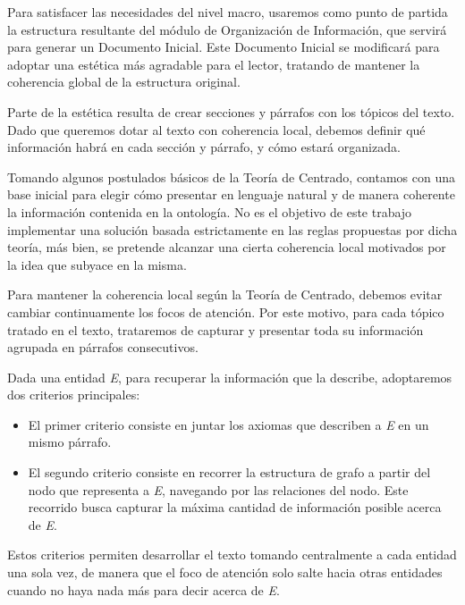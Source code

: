 Para satisfacer las necesidades del nivel macro, usaremos como punto de partida la estructura resultante del módulo de Organización de Información, que servirá para generar un Documento Inicial. Este Documento Inicial se modificará para adoptar una estética más agradable para el lector, tratando de mantener la coherencia global de la estructura original.

Parte de la estética resulta de crear secciones y párrafos con los tópicos del texto. Dado que queremos dotar al texto con coherencia local, debemos definir qué información habrá en cada sección y párrafo, y cómo estará organizada. 

Tomando algunos postulados básicos de la Teoría de Centrado, contamos con una base inicial para elegir cómo presentar en lenguaje natural y de manera coherente la información contenida en la ontología. No es el objetivo de este trabajo implementar una solución basada estrictamente en las reglas propuestas por dicha teoría, más bien, se pretende alcanzar una cierta coherencia local motivados por la idea que subyace en la misma.

Para mantener la coherencia local según la Teoría de Centrado, debemos evitar cambiar continuamente los focos de atención. Por este motivo, para cada tópico tratado en el texto, trataremos de capturar y presentar toda su información agrupada en párrafos consecutivos.  

Dada una entidad \emph{E}, para recuperar la información que la describe, adoptaremos dos criterios principales:
\begin{itemize}
    \item El primer criterio consiste en juntar los axiomas que describen a \emph{E} en un mismo párrafo. %
    \item El segundo criterio consiste en recorrer la estructura de grafo a partir del nodo que representa a \emph{E}, navegando por las relaciones del nodo. Este recorrido busca capturar la máxima cantidad de información posible acerca de \emph{E}. 
\end{itemize}

Estos criterios permiten desarrollar el texto tomando centralmente a cada entidad una sola vez, de manera que el foco de atención solo salte hacia otras entidades cuando no haya nada más para decir acerca de \emph{E}.


